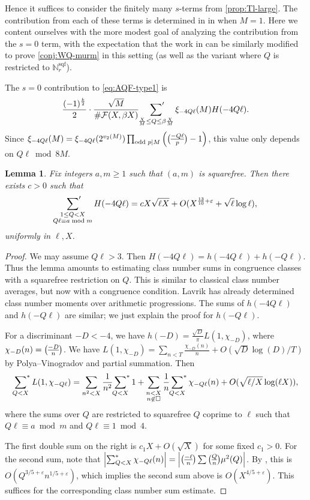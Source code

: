 \documentclass[11pt]{amsart}
\newcommand{\eps}{\varepsilon}
\renewcommand{\mod}{\bmod}
\newcommand{\sqf}{\mathrm{sqf}}
\newcommand{\leg}{\overwithdelims ()}
\newtheorem{lem}{Lemma}
\numberwithin{lem}{section}
\theoremstyle{remark}
\theoremstyle{definition}
\numberwithin{equation}{section}
\begin{document}
Hence it suffices to consider the finitely many $s$-terms from \cref{prop:Tl-large}.  The contribution from each of these terms is determined in \cite{zubrilina} in when $M=1$.  Here we content ourselves with the more modest goal of analyzing the contribution from the $s=0$ term, with the expectation that the work in \cite{zubrilina} can be similarly modified to prove \cref{conj:WQ-murm} in this setting (as well as the variant where $Q$ is restricted to $\mathbb N^\sqf_r$).

The $s=0$ contribution to \eqref{eq:AQF-type1} is
\begin{equation} \label{eq:AQF1-s0}
\frac{(-1)^{\frac k2}}2 \cdot \frac {\sqrt M}{\#\mathcal F(X,\beta X)}  \sideset{}{'}\sum_{\frac{X}M \le Q \le \beta \frac XM} \xi_{-4Q \ell}(M) H(-4Q \ell).
\end{equation}
Since $\xi_{-4Q \ell}(M) = \xi_{-4Q\ell}(2^{v_2(M)}) \prod_{\text{odd }p \mid M} \left( {-Q \ell \leg p} - 1 \right)$, this value only depends on $Q \ell \mod 8M$.

\begin{lem} Fix integers $a, m \ge 1$ such that $(a,m)$ is squarefree.  Then there exists $c > 0$ such that 
\[ \sideset{}{'}\sum_{\substack{1 \le Q < X \\ Q\ell \equiv a \mod m}} H(-4 Q \ell) = c X \sqrt{\ell X} + O(X^{\frac{13}{10}+\eps} + \sqrt \ell \log \ell ), \]
uniformly in $\ell, X$.
\end{lem}

\begin{proof}
We may assume $Q \ell > 3$.  Then $H(-4 Q\ell) = h(-4Q \ell) + h(-Q\ell)$.  Thus the lemma amounts to estimating class number sums in congruence classes with a squarefree restriction on $Q$.  This is similar to classical class number averages, but now with a congruence condition.  Lavrik \cite{lavrik} has already determined class number moments over arithmetic progressions.  The sums of $h(-4Q\ell)$ and $h(-Q\ell)$ are similar; we just explain the proof for $h(-Q\ell)$.

For a discriminant $-D < -4$, we have $h(-D) = \frac{\sqrt D}{\pi} L(1,\chi_{-D})$, where $\chi_{-D}(n) = {-D \leg n}$.  
We have $L(1,\chi_{-D}) = \sum_{n < T} \frac{\chi_{-D}(n)}{n} + O(\sqrt D \log(D)/T)$ by Polya--Vinogradov and partial summation.  Then 
\[ \sideset{}{^*}\sum_{Q < X} L(1, \chi_{-Q\ell}) = \sum_{n^2 < X}\frac 1{n^2}  \sideset{}{^*}\sum_{Q < X} 1 + \sum_{\substack{n < X \\ n \not \in \square}} \frac 1 n \sideset{}{^*}\sum_{Q < X}  {\chi_{-Q\ell}(n)}  + O(\sqrt {\ell / X} \log (\ell X)), \]
where the sums over $Q$ are restricted to squarefree $Q$ coprime to $\ell$ such that $Q\ell \equiv a \mod m$ and $Q \ell \equiv 1 \mod 4$.  

The first double sum on the right is $c_1 X + O(\sqrt X)$ for some fixed $c_1 > 0$.
For the second sum, note that $\left| \sum^*_{Q < X} \chi_{-Q \ell}(n) \right | = \left| {-\ell \leg n} \sum {Q \leg n} \mu^2(Q) \right|$.  By \cite[Lemma 6.7]{zubrilina}, this is $O(Q^{3/5 + \eps} n^{1/5+\eps})$, which implies the second sum above is $O(X^{4/5 + \eps})$.  
This suffices for the corresponding class number sum estimate.
\end{proof}
\end{document}
